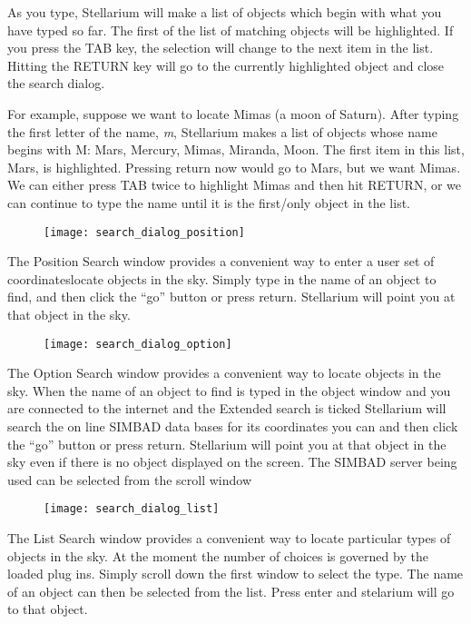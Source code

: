 As you type, Stellarium will make a list of objects which begin with
what you have typed so far. The first of the list of matching objects
will be highlighted. If you press the TAB key, the selection will change
to the next item in the list. Hitting the RETURN key will go to the
currently highlighted object and close the search dialog.

For example, suppose we want to locate Mimas (a moon of Saturn). After
typing the first letter of the name, \emph{m}, Stellarium makes a list
of objects whose name begins with M: Mars, Mercury, Mimas, Miranda,
Moon. The first item in this list, Mars, is highlighted. Pressing return
now would go to Mars, but we want Mimas. We can either press TAB twice
to highlight Mimas and then hit RETURN, or we can continue to type the
name until it is the first/only object in the list.

\begin{figure}[h]
\centering\texttt{[image: search\_dialog\_position]}
\end{figure}

The Position Search window provides a convenient way to enter a user set
of coordinateslocate objects in the sky. Simply type in the name of an
object to find, and then click the ``go'' button or press return.
Stellarium will point you at that object in the sky.

\begin{figure}[h]
\centering\texttt{[image: search\_dialog\_option]}
\end{figure}

The Option Search window provides a convenient way to locate objects in
the sky. When the name of an object to find is typed in the object
window and you are connected to the internet and the Extended search is
ticked Stellarium will search the on line SIMBAD data bases for its
coordinates you can and then click the ``go'' button or press return.
Stellarium will point you at that object in the sky even if there is no
object displayed on the screen. The SIMBAD server being used can be
selected from the scroll window

\begin{figure}[h]
\centering\texttt{[image: search\_dialog\_list]}
\end{figure}

The List Search window provides a convenient way to locate particular
types of objects in the sky. At the moment the number of choices is
governed by the loaded plug ins. Simply scroll down the first window to
select the type. The name of an object can then be selected from the
list. Press enter and stelarium will go to that object.

